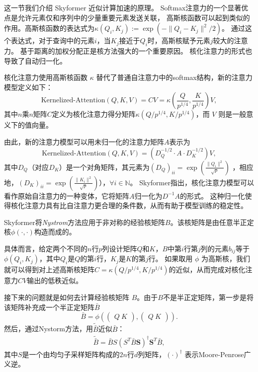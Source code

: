 这一节我们介绍 Skyformer 近似计算加速的原理。
\label{subsec:skyformer}
\label{sec:kernel_attn}
Softmax注意力的一个显著优点是允许元素仅和序列中的少量重要元素发送关联，
高斯核函数可以起到类似的作用。高斯核函数的表达式为$\kappa(Q_i,  K_j) := \exp \left(-\|Q_i - K_j\|^2 / 2 \right)$。
通过这个表达式，对于查询中的元素$i$，当$K_j$接近于$Q_i$时，高斯核赋予元素$j$较大的注意力。
基于距离的加权分配正是核方法强大的一个重要原因。
核化注意力的形式也导致了自动归一化。

核化注意力使用高斯核函数 $\kappa$ 替代了普通自注意力中的softmax结构，新的注意力模型定义如下：
\begin{equation}
\text{Kernelized-Attention}(Q,K,V) = C V = \kappa\left(\frac{Q}{p^{1/4}}, \frac{K}{p^{1/4}} \right) V,
\end{equation}
其中$n$乘$n$矩阵$C$定义为核化注意力得分矩阵$\kappa(Q / p^{1/4}, K / p^{1/4})$，而 $V$ 则是一般意义下的值向量。

由此，新的注意力模型可以用未归一化的注意力矩阵$A$表示为
\begin{equation*}
\text{Kernelized-Attention}(Q,K,V) = \left( D_Q^{-1/2} \cdot A \cdot D_K^{-1/2} \right) V,
\end{equation*}
其中$D_Q$（对应$D_K$）是一个对角矩阵，其元素为$(D_Q)_{ii} = \exp\left( \frac{\|Q_i\|^2}{\sqrt{p}} \right)$ ，相应地，$(D_K)_{ii} = \exp \left( \frac{\|K_i\|^2}{\sqrt{p}} \right)$），$\forall i \in \mathbb{N}$。
Skyformer指出，核化注意力模型可以看作原始自注意力的一种变体，它将矩阵$A$归一化为$D^{-1} A$的形式。
这种归一化使得核化注意力具有比自注意力更合理的条件数，从而有助于模型训练的稳定性。

\label{sec:nystrom}

Skyformer将\textit{Nystrom}方法应用于非对称的经验核矩阵$B$。该核矩阵是由任意半正定核$\phi(\cdot, \cdot)$构造而成的。

具体而言，给定两个不同的$n$行$p$列设计矩阵$Q$和$K$，$B$中第$i$行第$j$列的元素$b_{ij}$等于$\phi(Q_i, K_j)$，其中$Q_i$是$Q$的第$i$行，$K_j$是$K$的第$j$行。
如果取用 $\phi$ 为高斯核，我们就可以得到对上述高斯核矩阵$C = \kappa(Q / p^{1/4}, K / p^{1/4})$的近似，从而完成对核化注意力$C V$输出的低秩近似。

接下来的问题就是如何去计算经验核矩阵 $B$。由于$B$不是半正定矩阵，第一步是将该矩阵补充成一个半正定矩阵$\bar{B}$
\begin{equation}
\label{eqn:concat}
\bar{B} = \phi \left(
\begin{pmatrix}
Q \
K
\end{pmatrix},
\begin{pmatrix}
Q \
K
\end{pmatrix} \right).
\end{equation}
然后，通过Nystorm方法，用$\tilde{\bar{B}}$近似$\bar{B}$：
\begin{align}
\label{eqn:tilde_bar}
\tilde{\bar{B}} = \bar{B} S (S^{T} \bar{B}\textbf{S})^{\dagger} \textbf{S}^{T}\bar{B},
\end{align}
其中$S$是一个由均匀子采样矩阵构成的$2n$行$d$列矩阵，$(\cdot)^\dagger$ 表示Moore-Penrose广义逆。

